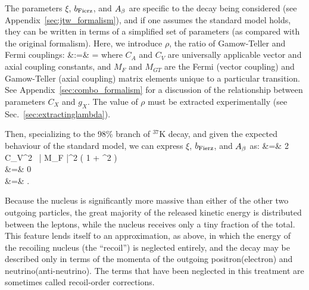 The parameters $\xi$, $b_{\mathrm{Fierz}}$, and $A_{\beta}$ are specific to the decay being considered (see Appendix~\ref{sec:jtw_formalism}), and if one assumes the standard model holds, they can be written in terms of a simplified set of parameters (as compared with the original formalism).  Here, we introduce $\rho$, the ratio of Gamow-Teller and Fermi couplings: 
\bea
\rho &:=&   \;\; = \;\; 
\label{eq:definerho_intro}
\eea
where $C_A$ and $C_V$ are universally applicable vector and axial coupling constants, and $M_F$ and $M_{GT}$ are the Fermi (vector coupling) and Gamow-Teller (axial coupling) matrix elements unique to a particular transition.  See Appendix~\ref{sec:combo_formalism} for a discussion of the relationship between parameters $C_X$ and $g_X$.  The value of $\rho$ must be extracted experimentally (see Sec.~\ref{sec:extractinglambda}). 
%
%
%  

Then, specializing to the 98\% branch of $^{37}$K decay, and given the expected behaviour of the standard model,
we can express $\xi$, $b_{\mathrm{Fierz}}$, and $A_{\beta}$ as:
\bea
\xi &=& 2 \,\, C_V^2 \, | M_F |^2 \left( 1 + \rho^2 \right)
\label{eq:xiwithrho_intro} 
\\
\bFierz &=& 0 
\label{bFierzwithrho_intro}
\\
\Abeta &=& .
\label{eq:Awithrho_intro}
\eea



Because the nucleus is significantly more massive than either of the other two outgoing particles, the great majority of the released kinetic energy is distributed between the leptons, while the nucleus receives only a tiny fraction of the total.  This feature lends itself to an approximation, as above, in which the energy of the recoiling nucleus (the ``recoil'') is neglected entirely, and the decay may be described only in terms of the momenta of the outgoing positron(electron) and neutrino(anti-neutrino).  
The terms that have been neglected in this treatment are sometimes called recoil-order corrections.

